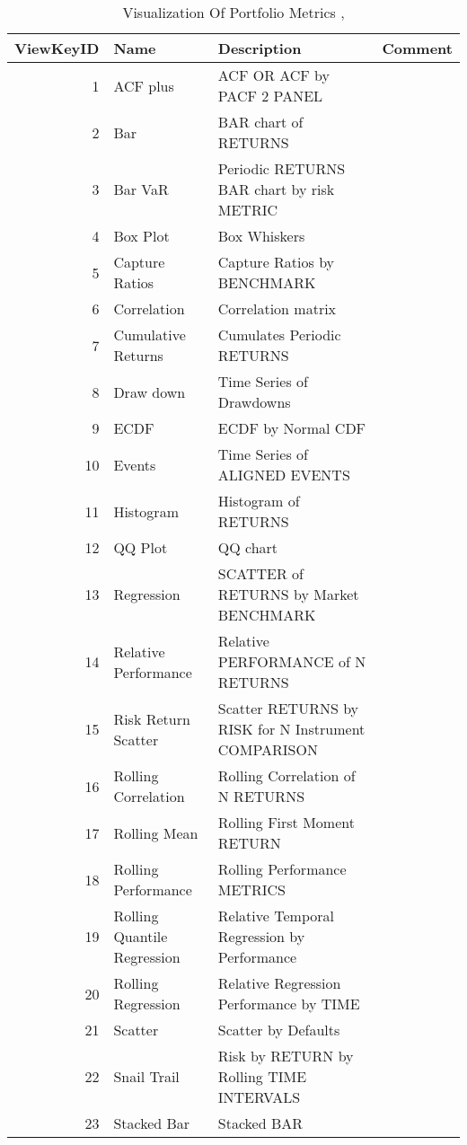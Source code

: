 \begin{table}
	\caption{Visualization Of Portfolio Metrics \cite{key100},\cite{key104}}
	\begin{tabular}{r|p{4cm}|ll}
		\hline
		ViewKeyID & Name & Description & Comment \\
		\hline
		1 & ACF plus & ACF OR ACF by PACF 2 PANEL & \\
		2 & Bar & BAR chart of RETURNS  & \\
		3 & Bar VaR & Periodic RETURNS BAR chart by risk METRIC & \\
		4 & Box Plot & Box Whiskers & \\
		5 & Capture Ratios & Capture Ratios by BENCHMARK  & \\
		6 & Correlation & Correlation matrix & \\
		7 & Cumulative Returns & Cumulates Periodic RETURNS  & \\
		8 & Draw down &	Time Series of Drawdowns  & \\
		9 & ECDF & ECDF by Normal CDF  & \\
		10 & Events & Time Series of ALIGNED EVENTS  & \\
		11 & Histogram	&  Histogram of RETURNS  & \\
		12 & QQ Plot & QQ chart  & \\
		\hline
		13 & Regression & SCATTER of RETURNS by Market BENCHMARK & \\
		14 & Relative Performance &	Relative PERFORMANCE of N RETURNS  & \\
		15 & Risk Return Scatter & Scatter RETURNS by RISK for N Instrument COMPARISON & \\
		\hline
		16 & Rolling Correlation &	Rolling Correlation of N RETURNS  & \\
		17 & Rolling Mean &	Rolling First Moment RETURN  & \\
		18 & Rolling Performance &	Rolling Performance METRICS & \\
		19 & Rolling Quantile Regression &	Relative Temporal Regression by Performance & \\
		20 & Rolling Regression & Relative Regression Performance by TIME  & \\
		\hline
		21 & Scatter &	Scatter by Defaults  & \\
		22 & Snail Trail &	Risk by RETURN by Rolling TIME INTERVALS  & \\
		23 & Stacked Bar &	Stacked BAR  & \\

\end{tabular}
\end{table}
